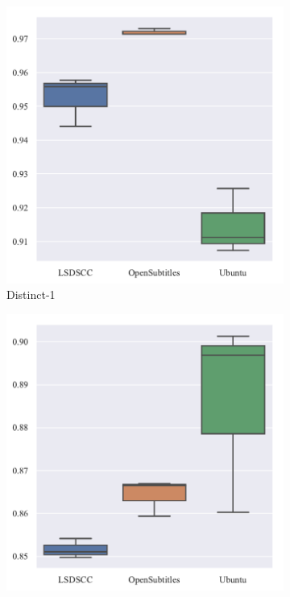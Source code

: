 \begin{figure}[H]
    \begin{subfigure}{0.25\linewidth}
        \centering
        \includegraphics[width=\linewidth]{figure/boxplot/dataset/distinct_1/plot.pdf}
        \caption{Distinct-1}
    \end{subfigure}%
    \begin{subfigure}{0.25\linewidth}
        \centering
        \includegraphics[width=\linewidth]{figure/boxplot/dataset/distinct_2/plot.pdf}

\end{subfigure}
\end{figure}
